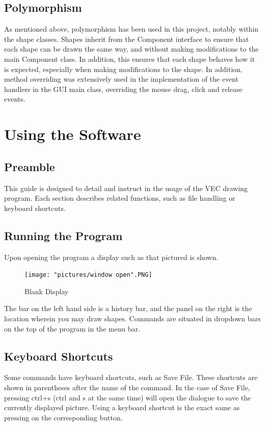 \documentclass[12pt]{article} %
\begin{document}
\subsection{Polymorphism}
As mentioned above, polymorphism has been used in this project, notably within the shape classes. Shapes inherit from the Component interface to ensure that each shape can be drawn the same way, and without making modifications to the main Component class. In addition, this ensures that each shape behaves how it is expected, especially when making modifications to the shape. In addition, method overriding was extensively used in the implementation of the event handlers in the GUI main class, overriding the mouse drag, click and release events. 

\newpage

\section{Using the Software}

\subsection{Preamble}
This guide is designed to detail and instruct in the usage of the VEC drawing program. Each section describes related functions, such as file handling or keyboard shortcuts.

\subsection{Running the Program}
Upon opening the program a display such as that pictured is shown. 

\begin{figure}[hbtp]
\caption{Blank Display}
\centering
\texttt{[image: "pictures/window open".PNG]}
\end{figure}


The bar on the left hand side is a history bar, and the panel on the right is the location wherein you may draw shapes. Commands are situated in dropdown bars on the top of the program in the menu bar. 

\subsection{Keyboard Shortcuts}
Some commands have keyboard shortcuts, such as Save File. These shortcuts are shown in parentheses after the name of the command. In the case of Save File, pressing ctrl+s (ctrl and s at the same time) will open the dialogue to save the currently displayed picture. Using a keyboard shortcut is the exact same as pressing on the corresponding button.
\end{document}
